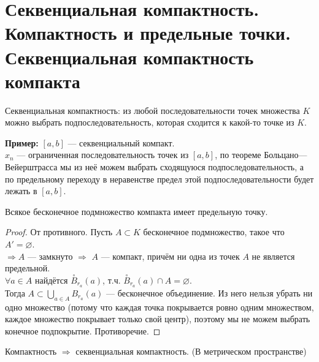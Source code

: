 \section{Секвенциальная компактность. Компактность и предельные точки. Секвенциальная компактность компакта \href{https://youtu.be/IwHCWoW4oes?t=2678}{\Walley}}

\begin{conj}
    Секвенциальная компактность: из любой последовательности точек множества
    $K$ можно выбрать подпоследовательность, которая сходится к какой-то точке из $K$.
\end{conj}

\textbf{Пример:}
    $[a,b]$ --- секвенциальный компакт. \\
    $x_n$ --- ограниченная последовательность точек из $[a,b]$, по теореме
    Больцано—Вейерштрасса мы из неё можем выбрать сходящуюся подпоследовательность, а
    по предельному переходу в неравенстве предел этой подпоследовательности будет лежать в $[a,b]$.
    
\begin{theorem-non}
    Всякое бесконечное подмножество компакта имеет предельную точку.

    \begin{proof}
        От противного. Пусть $A \subset K$ бесконечное подмножество, такое что $A' = \varnothing$. \\
        $\Longrightarrow A$ --- замкнуто $\Longrightarrow$ $A$ --- компакт, причём ни одна из точек $A$ не является предельной. \\
        $\forall a \in A$ найдётся $\overset{\circ}{B}_{r_a}(a)$, т.ч. $\overset{\circ}{B}_{r_a}(a) \cap A = \varnothing$. \\
        Тогда $A \subset \bigcup\limits_{a\in A} B_{r_a}(a)$ --- бесконечное объединение.
        Из него нельзя убрать ни одно множество (потому что каждая точка покрывается ровно одним множеством, каждое множество покрывает только свой центр), поэтому мы не можем выбрать конечное подпокрытие. Противоречие.
    \end{proof}

\end{theorem-non}
    
\follow \; Компактность $\Longrightarrow$ секвенциальная компактность. (В метрическом пространстве)

